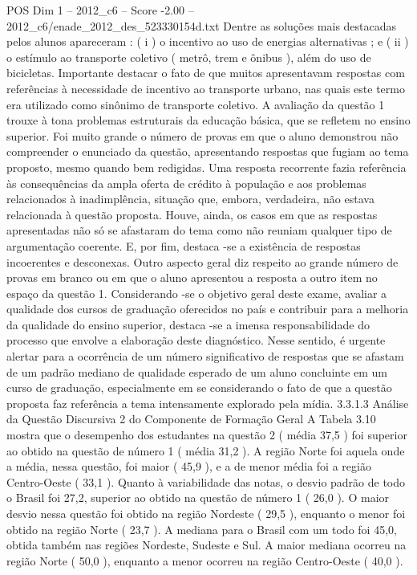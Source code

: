 \begin{textsample}{POS Dim 1 – 2012\_c6 – Score -2.00 – 2012\_c6/enade\_2012\_des\_523330154d.txt}
Dentre as soluções mais destacadas pelos alunos apareceram : ( i ) o incentivo ao uso de energias alternativas ; e ( ii ) o estímulo ao transporte coletivo ( metrô, trem e ônibus ), além do uso de bicicletas.
Importante destacar o fato de que muitos apresentavam respostas com referências à necessidade de incentivo ao transporte urbano, nas quais este termo era utilizado como sinônimo de transporte coletivo.
A avaliação da questão 1 trouxe à tona problemas estruturais da educação básica, que se refletem no ensino superior.
Foi muito grande o número de provas em que o aluno demonstrou não compreender o enunciado da questão, apresentando respostas que fugiam ao tema proposto, mesmo quando bem redigidas.
Uma resposta recorrente fazia referência às consequências da ampla oferta de crédito à população e aos problemas relacionados à inadimplência, situação que, embora, verdadeira, não estava relacionada à questão proposta.
Houve, ainda, os casos em que as respostas apresentadas não só se afastaram do tema como não reuniam qualquer tipo de argumentação coerente.
E, por fim, destaca -se a existência de respostas incoerentes e desconexas.
Outro aspecto geral diz respeito ao grande número de provas em branco ou em que o aluno apresentou a resposta a outro item no espaço da questão 1.
Considerando -se o objetivo geral deste exame, avaliar a qualidade dos cursos de graduação oferecidos no país e contribuir para a melhoria da qualidade do ensino superior, destaca -se a imensa responsabilidade do processo que envolve a elaboração deste diagnóstico.
Nesse sentido, é urgente alertar para a ocorrência de um número significativo de respostas que se afastam de um padrão mediano de qualidade esperado de um aluno concluinte em um curso de graduação, especialmente em se considerando o fato de que a questão proposta faz referência a tema intensamente explorado pela mídia. 3.3.1.3 Análise da Questão Discursiva 2 do Componente de Formação Geral A Tabela 3.10 mostra que o desempenho dos estudantes na questão 2 ( média 37,5 ) foi superior ao obtido na questão de número 1 ( média 31,2 ).
A região Norte foi aquela onde a média, nessa questão, foi maior ( 45,9 ), e a de menor média foi a região Centro-Oeste ( 33,1 ).
Quanto à variabilidade das notas, o desvio padrão de todo o Brasil foi 27,2, superior ao obtido na questão de número 1 ( 26,0 ).
O maior desvio nessa questão foi obtido na região Nordeste ( 29,5 ), enquanto o menor foi obtido na região Norte ( 23,7 ).
A mediana para o Brasil com um todo foi 45,0, obtida também nas regiões Nordeste, Sudeste e Sul.
A maior mediana ocorreu na região Norte ( 50,0 ), enquanto a menor ocorreu na região Centro-Oeste ( 40,0 ).

\end{textsample}
